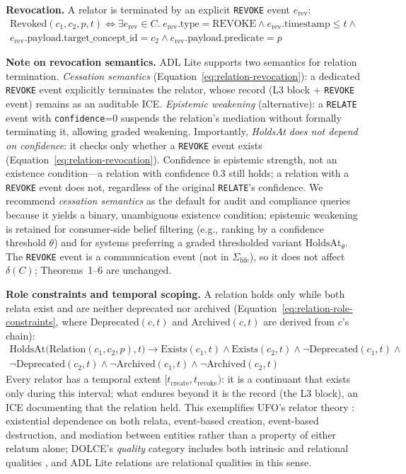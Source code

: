 \textbf{Revocation.} A relator is terminated by an explicit \texttt{REVOKE} event $e_{\text{rev}}$:
\begin{multline}\label{eq:relation-revocation}
    \text{Revoked}(c_1, c_2, p, t) \iff \exists e_{\text{rev}} \in C.\; e_{\text{rev}}.\text{type} = \text{REVOKE} \land e_{\text{rev}}.\text{timestamp} \leq t \land \\
    e_{\text{rev}}.\text{payload}.\text{target\_concept\_id} = c_2 \land e_{\text{rev}}.\text{payload}.\text{predicate} = p
\end{multline}

\textbf{Note on revocation semantics.} ADL Lite supports two semantics for relation termination. \emph{Cessation semantics} (Equation~\ref{eq:relation-revocation}): a dedicated \texttt{REVOKE} event explicitly terminates the relator, whose record (L3 block + \texttt{REVOKE} event) remains as an auditable ICE. \emph{Epistemic weakening} (alternative): a \texttt{RELATE} event with \texttt{confidence}=0 suspends the relation's mediation without formally terminating it, allowing graded weakening. Importantly, \emph{HoldsAt does not depend on confidence}: it checks only whether a \texttt{REVOKE} event exists (Equation~\ref{eq:relation-revocation}). Confidence is epistemic strength, not an existence condition---a relation with confidence 0.3 still holds; a relation with a \texttt{REVOKE} event does not, regardless of the original \texttt{RELATE}'s confidence. We recommend \emph{cessation semantics} as the default for audit and compliance queries because it yields a binary, unambiguous existence condition; epistemic weakening is retained for consumer-side belief filtering (e.g., ranking by a confidence threshold $\theta$) and for systems preferring a graded thresholded variant $\text{HoldsAt}_\theta$. The \texttt{REVOKE} event is a communication event (not in $\Sigma_{\text{life}}$), so it does not affect $\delta(C)$; Theorems~1--6 are unchanged.

\textbf{Role constraints and temporal scoping.} A relation holds only while both relata exist and are neither deprecated nor archived (Equation~\ref{eq:relation-role-constraints}, where $\text{Deprecated}(c,t)$ and $\text{Archived}(c,t)$ are derived from $c$'s chain):
\begin{multline}\label{eq:relation-role-constraints}
    \text{HoldsAt}\bigl(\text{Relation}(c_1, c_2, p), t\bigr) \rightarrow \text{Exists}(c_1, t) \land \text{Exists}(c_2, t) \land \neg\text{Deprecated}(c_1, t) \land \\
    \neg\text{Deprecated}(c_2, t) \land \neg\text{Archived}(c_1, t) \land \neg\text{Archived}(c_2, t)
\end{multline}
Every relator has a temporal extent $[t_{\text{create}}, t_{\text{revoke}})$: it is a continuant that exists only during this interval; what endures beyond it is the record (the L3 block), an ICE documenting that the relation held. This exemplifies UFO's relator theory \cite{ufo}: existential dependence on both relata, event-based creation, event-based destruction, and mediation between entities rather than a property of either relatum alone; DOLCE's \emph{quality} category includes both intrinsic and relational qualities \cite{dolce}, and ADL Lite relations are relational qualities in this sense.

